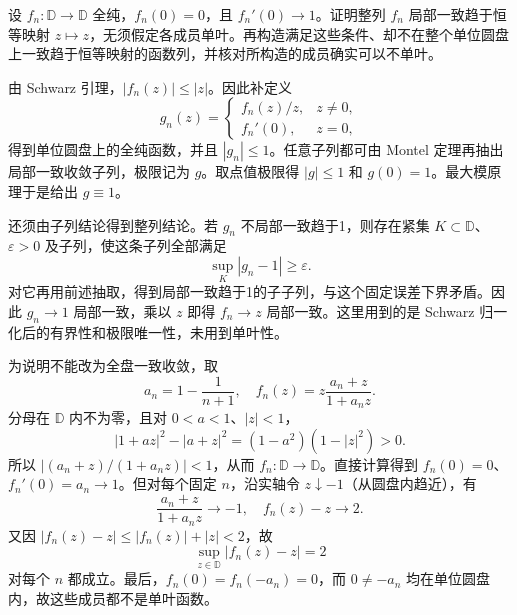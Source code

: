 \begin{exercise}\label{b3:ex:04-6}
设 \(f_n:\mathbb D\rightarrow\mathbb D\) 全纯，\(f_n(0)=0\)，且 \(f_n'(0)\to1\)。证明整列 \(f_n\) 局部一致趋于恒等映射 \(z\mapsto z\)，无须假定各成员单叶。再构造满足这些条件、却不在整个单位圆盘上一致趋于恒等映射的函数列，并核对所构造的成员确实可以不单叶。
\end{exercise}
\begin{solution}
由 Schwarz 引理，\(|f_n(z)|\le|z|\)。因此补定义
\[
 g_n(z)=
 \begin{cases}
  f_n(z)/z,&z\ne0,\\
  f_n'(0),&z=0,
 \end{cases}
\]
得到单位圆盘上的全纯函数，并且 \(|g_n|\le1\)。任意子列都可由 Montel 定理再抽出局部一致收敛子列，极限记为 \(g\)。取点值极限得 \(|g|\le1\) 和 \(g(0)=1\)。最大模原理于是给出 \(g\equiv1\)。

还须由子列结论得到整列结论。若 \(g_n\) 不局部一致趋于1，则存在紧集 \(K\subset\mathbb D\)、\(\varepsilon>0\) 及子列，使这条子列全部满足
\[
 \sup_K|g_n-1|\ge\varepsilon.
\]
对它再用前述抽取，得到局部一致趋于1的子子列，与这个固定误差下界矛盾。因此 \(g_n\to1\) 局部一致，乘以 \(z\) 即得 \(f_n\to z\) 局部一致。这里用到的是 Schwarz 归一化后的有界性和极限唯一性，未用到单叶性。

为说明不能改为全盘一致收敛，取
\[
 a_n=1-\frac1{n+1},\quad
 f_n(z)=z\frac{a_n+z}{1+a_nz}.
\]
分母在 \(\mathbb D\) 内不为零，且对 \(0<a<1\)、\(|z|<1\)，
\[
 |1+az|^2-|a+z|^2
 =(1-a^2)(1-|z|^2)>0.
\]
所以 \(\left|(a_n+z)/(1+a_nz)\right|<1\)，从而 \(f_n:\mathbb D\to\mathbb D\)。直接计算得到 \(f_n(0)=0\)、\(f_n'(0)=a_n\to1\)。但对每个固定 \(n\)，沿实轴令 \(z\downarrow-1\)（从圆盘内趋近），有
\[
 \frac{a_n+z}{1+a_nz}\longrightarrow-1,\quad
 f_n(z)-z\longrightarrow2.
\]
又因 \(|f_n(z)-z|\le|f_n(z)|+|z|<2\)，故
\[
 \sup_{z\in\mathbb D}|f_n(z)-z|=2
\]
对每个 \(n\) 都成立。最后，\(f_n(0)=f_n(-a_n)=0\)，而 \(0\ne-a_n\) 均在单位圆盘内，故这些成员都不是单叶函数。
\end{solution}

